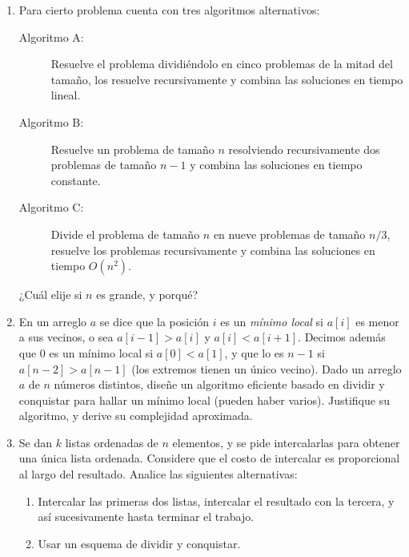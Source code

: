  \begin{enumerate}
  \item %
    Para cierto problema
    cuenta con tres algoritmos alternativos:
    \begin{description}
    \item[Algoritmo A:]
      Resuelve el problema dividiéndolo en cinco problemas
      de la mitad del tamaño,
      los resuelve recursivamente
      y combina las soluciones en tiempo lineal.
    \item[Algoritmo B:]
      Resuelve un problema de tamaño \(n\)
      resolviendo recursivamente dos problemas de tamaño \(n - 1\)
      y combina las soluciones en tiempo constante.
    \item[Algoritmo C:]
      Divide el problema de tamaño \(n\)
      en nueve problemas de tamaño \(n / 3\),
      resuelve los problemas recursivamente
      y combina las soluciones en tiempo \(O(n^2)\).
    \end{description}
    ¿Cuál elije si \(n\) es grande,
    y porqué?
  \item %
    En un arreglo \(a\) se dice que la posición \(i\) es un \emph{mínimo local}
    si \(a[i]\) es menor a sus vecinos,
    o sea \(a[i - 1] > a[i]\) y \(a[i] < a[i + 1]\).
    Decimos además que \num{0} es un mínimo local si \(a[0] < a[1]\),
    y que lo es \(n - 1\) si \(a[n - 2] > a[n - 1]\)
    (los extremos tienen un único vecino).
    Dado un arreglo \(a\) de \(n\) números distintos,
    diseñe un algoritmo eficiente basado en dividir y conquistar
    para hallar un mínimo local
    (pueden haber varios).
    Justifique su algoritmo,
    y derive su complejidad aproximada.
  \item %
    Se dan \(k\) listas ordenadas de \(n\) elementos,
    y se pide intercalarlas para obtener una única lista ordenada.
    Considere que el costo de intercalar es proporcional al largo del resultado.
    Analice las siguientes alternativas:
    \begin{enumerate}
    \item %
      Intercalar las primeras dos listas,
      intercalar el resultado con la tercera,
      y así sucesivamente hasta terminar el trabajo.
    \item %
      Usar un esquema de dividir y conquistar.
    \end{enumerate}
  \end{enumerate}




